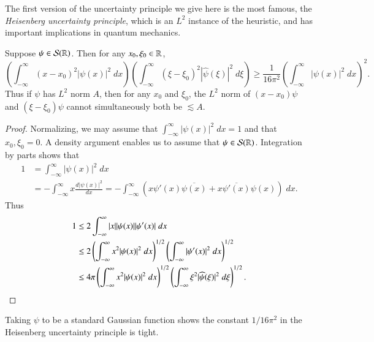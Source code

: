 The first version of the uncertainty principle we give here is the most famous, the \emph{Heisenberg uncertainty principle}, which is an $L^2$ instance of the heuristic, and has important implications in quantum mechanics.

\begin{theorem}[Heisenberg]
    Suppose $\psi \in \mathcal{S}(\operatorname{\mathbb{R}})$. Then for any $x_0,\xi_0 \in \operatorname{\mathbb{R}}$,
    \[ \left( \int_{-\infty}^\infty (x - x_0)^2 |\psi(x)|^2\; dx \right) \left( \int_{-\infty}^\infty (\xi - \xi_0)^2 |\widehat{\psi}(\xi)|^2\; d\xi \right) \geq \frac{1}{16 \pi^2} \left( \int_{-\infty}^\infty |\psi(x)|^2\; dx \right)^2. \]
    Thus if $\psi$ has $L^2$ norm $A$, then for any $x_0$ and $\xi_0$, the $L^2$ norm of $(x - x_0) \psi$ and $(\xi - \xi_0) \psi$ cannot simultaneously both be $\lesssim A$.
\end{theorem}
\begin{proof}
    Normalizing, we may assume that $\int_{-\infty}^\infty |\psi(x)|^2\; dx = 1$ and that $x_0,\xi_0 = 0$. A density argument enables us to assume that $\psi \in \mathcal{S}(\operatorname{\mathbb{R}})$. Integration by parts shows that
    \begin{align*}
        1 &= \int_{-\infty}^\infty |\psi(x)|^2\; dx\\
        &= - \int_{-\infty}^\infty x \frac{d|\psi(x)|^2}{dx} = - \int_{-\infty}^\infty (x \psi'(x) \overline{\psi(x)} + x \overline{\psi'(x)} \psi(x))\; dx.
    \end{align*}
    Thus
    \begin{align*}
        1 &\leq 2 \int_{-\infty}^\infty |x| |\psi(x)| |\psi'(x)|\; dx\\
        &\leq 2 \left( \int_{-\infty}^\infty x^2 |\psi(x)|^2\; dx \right)^{1/2} \left( \int_{-\infty}^\infty |\psi'(x)|^2\; dx \right)^{1/2}\\
        &\leq 4 \pi \left( \int_{-\infty}^\infty x^2 |\psi(x)|^2\; dx \right)^{1/2} \left( \int_{-\infty}^\infty \xi^2 |\widehat{\psi}(\xi)|^2\; d\xi \right)^{1/2}. \qedhere
    \end{align*}
\end{proof}

\begin{remark}
    Taking $\psi$ to be a standard Gaussian function shows the constant $1 / 16 \pi^2$ in the Heisenberg uncertainty principle is tight.
\end{remark}

